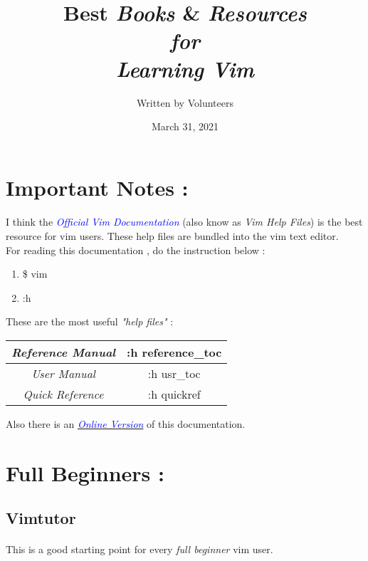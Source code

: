 \documentclass[12pt, a4paper]{article}
\title{Best \emph{Books} \& \emph{Resources}\\\textit{for}\\\emph{Learning Vim}}
\author{Written by Volunteers}
\date{March 31, 2021}
\begin{document}
\maketitle

\section*{Important Notes :}

\paragraph{}
I think the \textcolor{blue}{\emph{Official Vim Documentation}} (also know as \emph{Vim Help Files}) is the best resource for vim users. These help files are bundled into the vim text editor.\\

For reading this documentation , do the instruction below :
\begin{enumerate}
	\item 	\$ vim
	\item 	:h
\end{enumerate}

These are the most useful \emph{"help files"} :
\begin{table}[h!]
\centering

\begin{tabular}{|c|c|} \hline
	\emph{Reference Manual} & :h reference\_toc\\ \hline
	\emph{User Manual} & :h usr\_toc\\ \hline
	\emph{Quick Reference} & :h quickref\\
	\hline
\end{tabular}

\end{table}

Also there is an \href{https://vimhelp.org}{\textcolor{blue}{\emph{Online Version}}} of this documentation.

\newpage

\section{Full Beginners :}
\subsection*{Vimtutor}
\paragraph{}
This is a good starting point for every \emph{full beginner} vim user.
\end{document}
